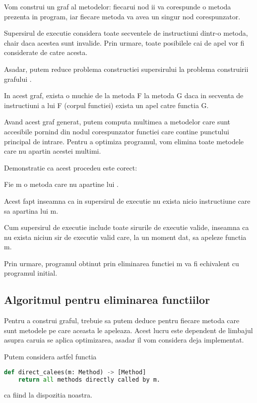 Vom construi un graf  al metodelor: fiecarui nod ii va
corespunde o metoda prezenta in program, iar fiecare metoda va
avea un singur nod corespunzator.

Supersirul de executie considera toate secventele de instructiuni
dintr-o metoda, chair daca acestea sunt invalide.
Prin urmare, toate posibilele cai de apel vor fi considerate de
catre acesta.

Asadar, putem reduce problema constructiei supersirului la
problema construirii grafului .

In acest graf, exista o muchie de la metoda F la metoda
G daca in secventa de instructiuni a lui F (corpul functiei)
exista un apel catre functia G.

Avand acest graf generat, putem computa multimea  a metodelor
care sunt accesibile pornind din nodul corespunzator functiei care
contine punctului principal de intrare.
Pentru a optimiza programul, vom elimina toate metodele care nu
apartin acestei multimi.

Demonstratie ca acest procedeu este corect:
\begin{lemma}

Fie m o metoda care nu apartine lui .

Acest fapt inseamna ca in supersirul de executie nu exista nicio
instructiune care sa apartina lui m.

Cum supersirul de executie include toate sirurile de executie
valide, inseamna ca nu exista niciun sir de executie valid care,
la un moment dat, sa apeleze functia m.

Prin urmare, programul obtinut prin eliminarea functiei m va fi
echivalent cu programul initial.
\end{lemma}

\subsection{Algoritmul pentru eliminarea functiilor}

Pentru a construi graful, trebuie sa putem deduce pentru fiecare
metoda care sunt metodele pe care aceasta le apeleaza.
Acest lucru este dependent de limbajul asupra caruia se aplica
optimizarea, asadar il vom considera deja implementat.

Putem considera astfel functia
\begin{lstlisting}[language=Python]
def direct_calees(m: Method) -> [Method]
    return all methods directly called by m.
\end{lstlisting}
ca fiind la dispozitia noastra.


